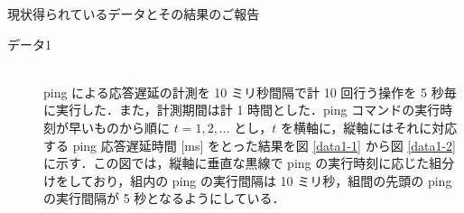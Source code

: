 \documentclass[a4j]{jarticle}
\begin{document}
\begin{center}
{\large 現状得られているデータとその結果のご報告}
\end{center}
\begin{description}
\item[データ1]　\\
ping による応答遅延の計測を 10 ミリ秒間隔で計 10 回行う操作を 5 秒毎に実行した．また，計測期間は計 1 時間とした．ping コマンドの実行時刻が早いものから順に $t = 1,2,\ldots$ とし，$t$ を横軸に，縦軸にはそれに対応する ping 応答遅延時間 [ms] をとった結果を図 \ref{data1-1} から図 \ref{data1-2} に示す．この図では，縦軸に垂直な黒線で ping の実行時刻に応じた組分けをしており，組内の ping の実行間隔は 10 ミリ秒，組間の先頭の ping の実行間隔が 5 秒となるようにしている．
\begin{figure}[tb]
\begin{center}
~
~
\\


\end{center}
\end{figure}
\end{description}
\end{document}
